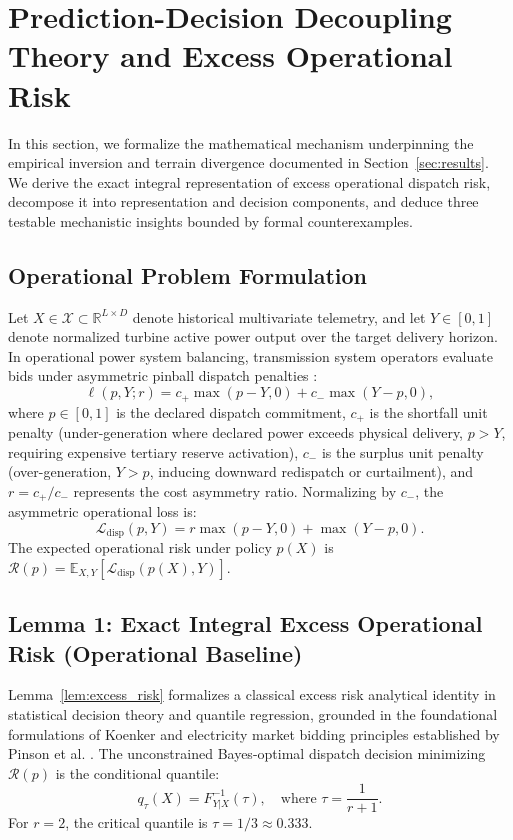 \section{Prediction-Decision Decoupling Theory and Excess Operational Risk}
\label{sec:theory}

In this section, we formalize the mathematical mechanism underpinning the empirical inversion and terrain divergence documented in Section~\ref{sec:results}. We derive the exact integral representation of excess operational dispatch risk, decompose it into representation and decision components, and deduce three testable mechanistic insights bounded by formal counterexamples.

\subsection{Operational Problem Formulation}
Let $X \in \mathcal{X} \subset \mathbb{R}^{L \times D}$ denote historical multivariate telemetry, and let $Y \in [0, 1]$ denote normalized turbine active power output over the target delivery horizon. In operational power system balancing, transmission system operators evaluate bids under asymmetric pinball dispatch penalties \cite{weron2014,zhang2014wind}:
\begin{equation}
\ell(p, Y; r) = c_+ \max(p - Y, 0) + c_- \max(Y - p, 0),
\label{eq:pinball_loss}
\end{equation}
where $p \in [0, 1]$ is the declared dispatch commitment, $c_+$ is the shortfall unit penalty (under-generation where declared power exceeds physical delivery, $p > Y$, requiring expensive tertiary reserve activation), $c_-$ is the surplus unit penalty (over-generation, $Y > p$, inducing downward redispatch or curtailment), and $r = c_+ / c_-$ represents the cost asymmetry ratio. Normalizing by $c_-$, the asymmetric operational loss is:
\begin{equation}
\mathcal{L}_{\text{disp}}(p, Y) = r \max(p - Y, 0) + \max(Y - p, 0).
\label{eq:norm_disp_loss}
\end{equation}
The expected operational risk under policy $p(X)$ is $\mathcal{R}(p) = \mathbb{E}_{X, Y} [\mathcal{L}_{\text{disp}}(p(X), Y)]$.

\subsection{Lemma 1: Exact Integral Excess Operational Risk (Operational Baseline)}
Lemma~\ref{lem:excess_risk} formalizes a classical excess risk analytical identity in statistical decision theory and quantile regression, grounded in the foundational formulations of Koenker \cite{koenker2005} and electricity market bidding principles established by Pinson et al. \cite{pinson2007trading}. The unconstrained Bayes-optimal dispatch decision minimizing $\mathcal{R}(p)$ is the conditional quantile:
\begin{equation}
q_\tau(X) = F_{Y|X}^{-1}(\tau), \quad \text{where } \tau = \frac{1}{r + 1}.
\label{eq:bayes_quantile}
\end{equation}
For $r=2$, the critical quantile is $\tau = 1/3 \approx 0.333$.

